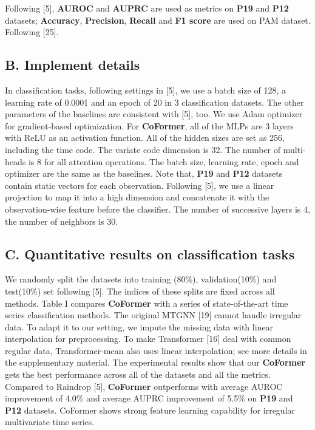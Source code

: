 \documentclass[twocolumn]{article}
\begin{document}
Following [5], \textbf{AUROC} and \textbf{AUPRC} are used as metrics on \textbf{P19} and \textbf{P12} datasets; \textbf{Accuracy}, \textbf{Precision}, \textbf{Recall} and \textbf{F1 score} are used on PAM dataset. Following [25].

\subsection*{B. Implement details}
In classification tasks, following settings in [5], we use a batch size of 128, a learning rate of 0.0001 and an epoch of 20 in 3 classification datasets. The other parameters of the baselines are consistent with [5], too. We use Adam optimizer for gradient-based optimization. For \textbf{CoFormer}, all of the MLPs are 3 layers with ReLU as an activation function. All of the hidden sizes are set as 256, including the time code. The variate code dimension is 32. The number of multi-heads is 8 for all attention operations. The batch size, learning rate, epoch and optimizer are the same as the baselines. Note that, \textbf{P19} and \textbf{P12} datasets contain static vectors for each observation. Following [5], we use a linear projection to map it into a high dimension and concatenate it with the observation-wise feature before the classifier. The number of successive layers is 4, the number of neighbors is 30.

\subsection*{C. Quantitative results on classification tasks}
We randomly split the datasets into training (80\%), validation(10\%) and test(10\%) set following [5]. The indices of these splits are fixed across all methods. Table I compares \textbf{CoFormer} with a series of state-of-the-art time series classification methods. The original MTGNN [19] cannot handle irregular data. To adapt it to our setting, we impute the missing data with linear interpolation for preprocessing. To make Transformer [16] deal with common regular data, Transformer-mean also uses linear interpolation; see more details in the supplementary material. The experimental results show that our \textbf{CoFormer} gets the best performance across all of the datasets and all the metrics. Compared to Raindrop [5], \textbf{CoFormer} outperforms with average AUROC improvement of 4.0\% and average AUPRC improvement of 5.5\% on \textbf{P19} and \textbf{P12} datasets. CoFormer shows strong feature learning capability for irregular multivariate time series.
\end{document}
